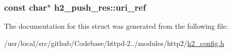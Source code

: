 \subsubsection[{\texorpdfstring{uri\+\_\+ref}{uri_ref}}]{\setlength{\rightskip}{0pt plus 5cm}const char$\ast$ h2\+\_\+push\+\_\+res\+::uri\+\_\+ref}\hypertarget{structh2__push__res_acc7a58a1a7fb8bbbb532694a6ce72a17}{}\label{structh2__push__res_acc7a58a1a7fb8bbbb532694a6ce72a17}


The documentation for this struct was generated from the following file\+:\begin{DoxyCompactItemize}
\item 
/usr/local/src/github/\+Codebase/httpd-\/2../modules/http2/\hyperlink{h2__config_8h}{h2\+\_\+config.\+h}\end{DoxyCompactItemize}
